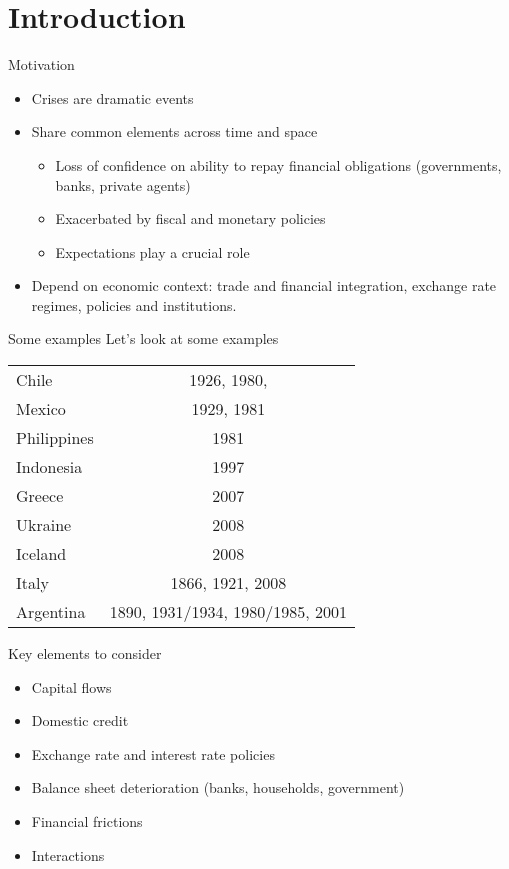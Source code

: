 \documentclass{beamer}
\begin{document}
  \section{Introduction}
  \begin{frame}{Motivation}
	  \begin{itemize}
	  \item Crises are dramatic events 
	  \item Share common elements across time and space
	  \begin{itemize}
	  \item Loss of confidence on ability to repay financial obligations (governments, banks, private agents)
	  \item Exacerbated by fiscal and monetary policies
	  \item Expectations play a crucial role
	  \end{itemize}
	  \item Depend on economic context: trade and financial integration, exchange rate regimes, policies and institutions. 
	  \end{itemize}
  \end{frame}

\begin{frame}{Some examples}
Let's look at some examples
\centering
\begin{tabular}{lc} \hline
Chile & 1926, 1980, \\
Mexico & 1929, 1981 \\
Philippines & 1981\\
Indonesia & 1997\\ 
Greece & 2007 \\
Ukraine & 2008 \\
Iceland & 2008 \\

Italy & 1866, 1921, 2008 \\
Argentina & 1890, 1931/1934, 1980/1985, 2001 \\ \hline 
\end{tabular}
\end{frame}

  \begin{frame}{Key elements to consider}
	\begin{itemize}
	\item Capital flows
	\item Domestic credit 
	\item Exchange rate and interest rate policies
	\item Balance sheet deterioration (banks, households, government)
	\item Financial frictions
	\item Interactions
	\end{itemize}
  \end{frame}
  
\end{document}
